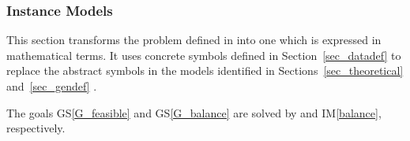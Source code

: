 \documentclass[12pt]{article}
\newcommand{\colAwidth}{0.13\textwidth}
\newcommand{\colBwidth}{0.82\textwidth}
\newcommand{\aref}[1]{A\ref{#1}}
\newcommand{\gsref}[1]{GS\ref{#1}}
\newcounter{instnum} %
\newcommand{\iref}[1]{IM\ref{#1}}
\begin{document}
\subsubsection{Instance Models} \label{sec_instance}

This section transforms the problem defined in  into
one which is expressed in mathematical terms. It uses concrete symbols defined
in Section~\ref{sec_datadef} to replace the abstract symbols in the models
identified in Sections~\ref{sec_theoretical} and~\ref{sec_gendef} .

The goals \gsref{G_feasible} and \gsref{G_balance} are solved by
and \iref{balance}, respectively.

\end{document}

